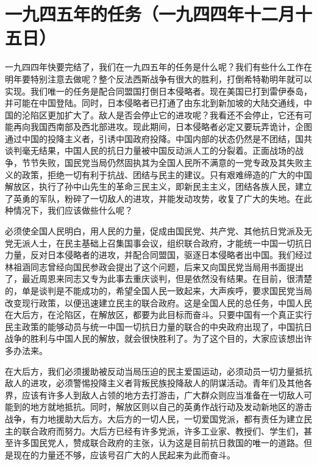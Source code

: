 \section[一九四五年的任务（一九四四年十二月十五日）]{一九四五年的任务（一九四四年十二月十五日）}


一九四四年快要完结了，我们在一九四五年的任务是什么呢？我们有些什么工作在明年要特别注意去做呢？整个反法西斯战争有很大的胜利，打倒希特勒明年就可以实现。我们唯一的任务是配合同盟国打倒日本侵略者。现在美国已打到雷伊泰岛，并可能在中国登陆。同时，日本侵略者已打通了由东北到新加坡的大陆交通线，中国的沦陷区更加扩大了。敌人是否会停止它的进攻呢？我看还不会停止，它还有可能再向我国西南部及西北部进攻。现此期间，日本侵略者必定又要玩弄诡计，企图通过中国的投降主义者，引诱中国政府投降。中国内部的状态仍然是不团结，国共谈判毫无结果，中国人民的抗日力量被中国反动派人工的分裂着。正面战场的战争，节节失败，国民党当局仍然固执其为全国人民所不满意的一党专政及其失败主义的政策，拒绝一切有利于抗战、团结与民主的建议。只有艰难缔造的广大的中国解放区，执行了孙中山先生的革命三民主义，即新民主主义，团结各族人民，建立了英勇的军队，粉碎了一切敌人的进攻，并能发动攻势，收复了广大的失地。在此种情况下，我们应该做些什么呢？

必须使全国人民明白，用人民的力量，促成由国民党、共产党、其他抗日党派及无党无派人士，在民主基础上召集国事会议，组织联合政府，才能统一中国一切抗日力量，反对日本侵略者的进攻，并配合同盟国，驱逐日本侵略者出中国。我们经过林祖涵同志曾经向国民参政会提出了这个问题，后来又向国民党当局用书面提出了，最近周恩来同志又专为此事去重庆谈判，但是依然没有结果。在目前，很清楚的，单是谈判是不能成功的，希望全国人民一致起来，大声疾呼，要求国民党当局改变现行政策，以便迅速建立民主的联合政府。这是全国人民的总任务，中国人民在大后方，在沦陷区，在解放区，都要为此目标而奋斗。只要中国有一个真正实行民主政策的能够动员与统一中国一切抗日力量的联合的中央政府出现了，中国抗日战争的胜利与中国人民的解放，就会很快胜利了。为了这个目的，大家应该想出许多办法来。


在大后方，我们必须援助被反动当局压迫的民主爱国运动，必须动员一切力量抵抗敌人的进攻，必须警惕投降主义者背叛民族投降敌人的阴谋活动。青年们及其他各界，应该有许多人到敌人占领的地方去打游击，广大群众则应当准备在一切敌人可能到的地方就地抵抗。同时，解放区则以自己的英勇作战行动及发动新地区的游击战争，有力地援助大后方。大后方的一切人民，一切爱国党派，都有责任为建立民主的联合政府而努力。大后方已经有许多党派，许多工业家、教授们、学生们，甚至许多国民党人，赞成联合政府的主张，认为这是目前抗日救国的唯一的道路。但是现在的力量还不够，应该号召广大的人民起来为此而奋斗。

